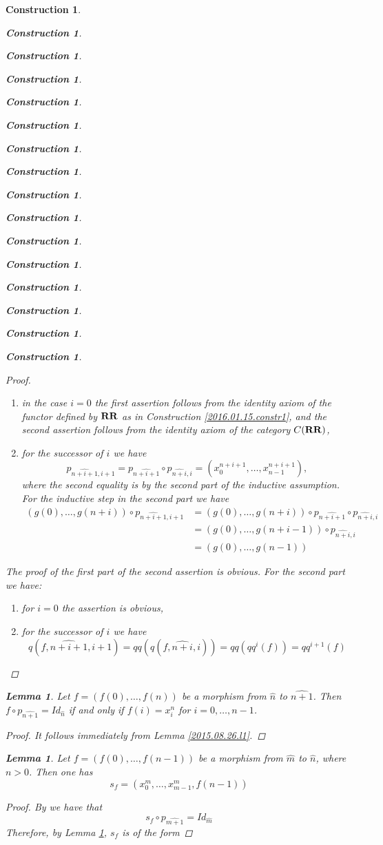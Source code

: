 \documentclass[onecolumn,12pt]{amsart}
\newtheorem{lemma}[proposition]{Lemma}
\numberwithin{proposition}{subsection}
\newtheorem{construction}[proposition]{Construction}
\newcommand{\wh}{\widehat}
\newcommand{\RR}{{\bf RR}}
\begin{document}
\begin{construction}
\begin{construction}
\begin{construction}
\begin{construction}
\begin{construction}
\begin{construction}
\begin{construction}
\begin{construction}
\begin{construction}
\begin{construction}
\begin{construction}
\begin{construction}
\begin{construction}
\begin{construction}
\begin{construction}
\begin{construction}
\begin{proof}
%
\begin{enumerate}
\item in the case $i=0$ the first assertion follows from the identity axiom of
  the functor defined by $\RR$ as in Construction \ref{2016.01.15.constr1}, and
  the second assertion follows from the identity axiom of the category $C(\RR)$,
\item for the successor of $i$ we have
%
$$p_{\wh{n+i+1},i+1}=p_{\wh{n+i+1}}\circ p_{\wh{n+i},i}=(x_0^{n+i+1},\dots,x_{n-1}^{n+i+1}),$$
%
where the second equality is by the second part of the inductive
assumption. For the inductive step in the second part we have
%
\begin{equation*}
  \begin{split}
    (g(0),\dots,g(n+i))\circ p_{\wh{n+i+1},i+1}&=(g(0),\dots,g(n+i))\circ p_{\wh{n+i+1}}\circ p_{\wh{n+i},i}
    \\&=
    (g(0),\dots,g(n+i-1))\circ p_{\wh{n+i},i}
    \\&=
    (g(0),\dots,g(n-1))
  \end{split}
\end{equation*}
%
\end{enumerate}
%
The proof of the first part of the second assertion is obvious. For the second
part we have:
%
\begin{enumerate}
\item for $i=0$ the assertion is obvious,
\item for the successor of $i$ we have 
%
$$q(f,\wh{n+i+1},i+1)=qq(q(f,\wh{n+i},i))=qq(qq^i(f))=qq^{i+1}(f)$$
%
\end{enumerate}
%
\end{proof}
%
\begin{lemma}
\label{2015.08.22.l7}
Let $f=(f(0),\dots,f(n))$ be a morphism from $\wh{n}$ to $\wh{n+1}$. Then
$f\circ p_{\wh{n+1}}=Id_{\wh{n}}$ if and only if $f(i)=x_i^{n}$ for
$i=0,\dots,n-1$.
\end{lemma}
%
\begin{proof}
It follows immediately from Lemma \ref{2015.08.26.l1}.
\end{proof}
%
\begin{lemma}
\label{2015.09.09.l1}
Let $f=(f(0),\dots,f(n-1))$ be a morphism from $\wh{m}$ to $\wh{n}$, where $n>0$. Then one has
%
$$s_f=(x_0^{m},\dots,x_{m-1}^{m},f(n-1))$$
%
\end{lemma}
%
\begin{proof}
By \cite[Definition 2.3(2)]{Csubsystems} we have that 
%
$$s_f\circ p_{\wh{m+1}}=Id_{\wh{m}}$$
%
Therefore, by Lemma \ref{2015.08.22.l7}, $s_f$ is of the form

\end{proof}
\end{construction}
\end{construction}
\end{construction}
\end{construction}
\end{construction}
\end{construction}
\end{construction}
\end{construction}
\end{construction}
\end{construction}
\end{construction}
\end{construction}
\end{construction}
\end{construction}
\end{construction}
\end{construction}
\end{document}
